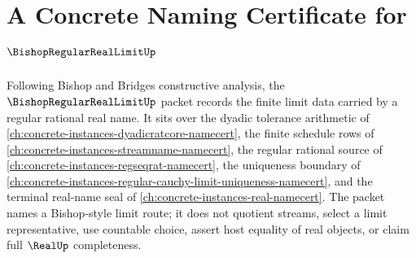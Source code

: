 \chapter{A Concrete Naming Certificate for $\BishopRegularRealLimitUp$}
\label{ch:concrete-instances-bishop-regular-real-limit-namecert}

Following Bishop and Bridges constructive analysis, the $\BishopRegularRealLimitUp$ packet records the finite limit data carried by a regular rational real name. It sits over the dyadic tolerance arithmetic of \autoref{ch:concrete-instances-dyadicratcore-namecert}, the finite schedule rows of \autoref{ch:concrete-instances-streamname-namecert}, the regular rational source of \autoref{ch:concrete-instances-regseqrat-namecert}, the uniqueness boundary of \autoref{ch:concrete-instances-regular-cauchy-limit-uniqueness-namecert}, and the terminal real-name seal of \autoref{ch:concrete-instances-real-namecert}. The packet names a Bishop-style limit route; it does not quotient streams, select a limit representative, use countable choice, assert host equality of real objects, or claim full $\RealUp$ completeness.

